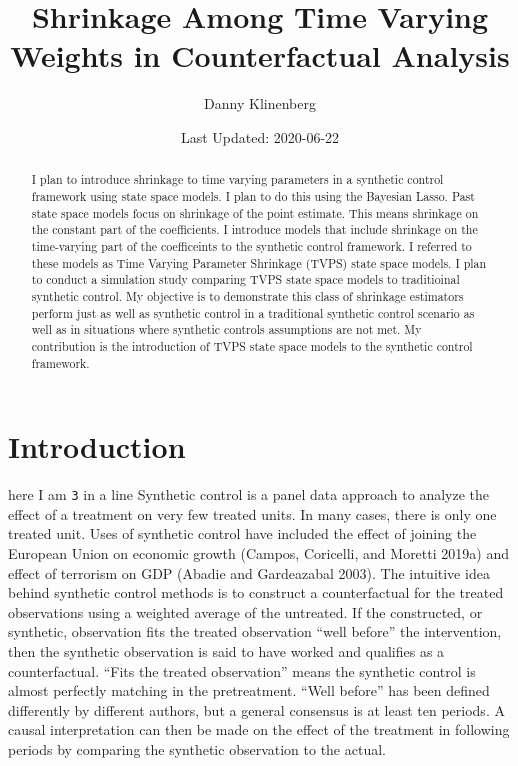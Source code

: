 \documentclass[
]{article}
\title{Shrinkage Among Time Varying Weights in Counterfactual Analysis}
\author{Danny Klinenberg}
\date{Last Updated: 2020-06-22}
\begin{document}
\maketitle
\begin{abstract}
I plan to introduce shrinkage to time varying parameters in a synthetic
control framework using state space models. I plan to do this using the
Bayesian Lasso. Past state space models focus on shrinkage of the point
estimate. This means shrinkage on the constant part of the coefficients.
I introduce models that include shrinkage on the time-varying part of
the coefficeints to the synthetic control framework. I referred to these
models as Time Varying Parameter Shrinkage (TVPS) state space models. I
plan to conduct a simulation study comparing TVPS state space models to
traditioinal synthetic control. My objective is to demonstrate this
class of shrinkage estimators perform just as well as synthetic control
in a traditional synthetic control scenario as well as in situations
where synthetic controls assumptions are not met. My contribution is the
introduction of TVPS state space models to the synthetic control
framework.
\end{abstract}

\hypertarget{introduction}{%
\section{Introduction}\label{introduction}}

here I am \texttt{3} in a line Synthetic control is a panel data
approach to analyze the effect of a treatment on very few treated units.
In many cases, there is only one treated unit. Uses of synthetic control
have included the effect of joining the European Union on economic
growth (Campos, Coricelli, and Moretti 2019a) and effect of terrorism on
GDP (Abadie and Gardeazabal 2003). The intuitive idea behind synthetic
control methods is to construct a counterfactual for the treated
observations using a weighted average of the untreated. If the
constructed, or synthetic, observation fits the treated observation
``well before'' the intervention, then the synthetic observation is said
to have worked and qualifies as a counterfactual. ``Fits the treated
observation'' means the synthetic control is almost perfectly matching
in the pretreatment. ``Well before'' has been defined differently by
different authors, but a general consensus is at least ten periods. A
causal interpretation can then be made on the effect of the treatment in
following periods by comparing the synthetic observation to the actual.
\end{document}
